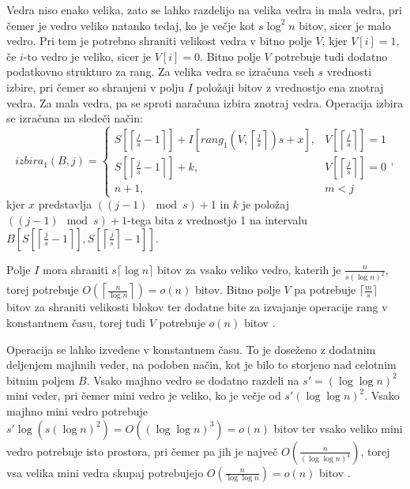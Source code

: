 Vedra niso enako velika, zato se lahko razdelijo na velika vedra in mala vedra, pri čemer je vedro veliko natanko tedaj, ko je večje kot $s\log^2 n$ bitov, sicer je malo vedro. Pri tem je potrebno shraniti velikost vedra v bitno polje $V$, kjer $V[i]=1$, če $i$-to vedro je veliko, sicer je $V[i]=0$. Bitno polje $V$ potrebuje tudi dodatno podatkovno strukturo za rang. Za velika vedra se izračuna vseh $s$ vrednosti izbire, pri čemer so shranjeni v polju $I$ položaji bitov z vrednostjo ena znotraj vedra. Za mala vedra, pa se sproti naračuna izbira znotraj vedra. Operacija izbira se izračuna na sledeči način:
\begin{equation}
    izbira_1(B,j)=\left\{
    \begin{array}{rl}
       S\left[\left\lceil \frac{j}{s} -1\right\rceil\right] + I\left[rang_1(V,\left\lceil \frac{j}{s} \right\rceil)s+x\right], & V\left[\left\lceil \frac{j}{s} \right\rceil\right] = 1\\ 
       S\left[\left\lceil \frac{j}{s} -1 \right\rceil\right] + k, & V\left[\left\lceil \frac{j}{s} \right\rceil\right] = 0\\
       n+1, & m < j
    \end{array}\right.,
\end{equation}
kjer $x$ predstavlja $((j-1) \mod{s})+1$ in $k$ je položaj $((j-1) \mod{s})+1$-tega bita z vrednostjo 1 na intervalu $B\left[ S\left[\left\lceil \frac{j}{s} -1 \right\rceil\right], S\left[\left\lceil \frac{j}{s} \right\rceil-1\right]\right]$.

Polje $I$ mora shraniti $s\lceil\log n\rceil$ bitov za vsako veliko vedro, katerih je $\frac{n}{s(\log n)^2}$, torej potrebuje $O\left(\left\lceil\frac{n}{\log n}\right\rceil\right)=o(n)$ bitov. Bitno polje $V$ pa potrebuje $\lceil \frac{m}{s} \rceil$ bitov za shraniti velikosti blokov ter dodatne bite za izvajanje operacije rang v konstantnem času, torej tudi $V$ potrebuje $o(n)$ bitov \cite{Navarro2016}.

Operacija se lahko izvedene v konstantnem času. To je doseženo z dodatnim deljenjem majhnih veder, na podoben način, kot je bilo to storjeno nad celotnim bitnim poljem $B$. Vsako majhno vedro se dodatno razdeli na $s'=(\log\log n)^2$ mini veder, pri čemer mini vedro je veliko, ko je večje od $s'(\log\log n)^2$. Vsako majhno mini vedro potrebuje $s'\log{(s(\log{n})^2)}=O((\log\log n)^3)=o(n)$ bitov ter vsako veliko mini vedro potrebuje isto prostora, pri čemer pa jih je največ $O\left(\frac{n}{(\log\log n)^4}\right)$, torej vsa velika mini vedra skupaj potrebujejo $O\left(\frac{n}{\log\log n}\right) =o(n)$ bitov \cite{Navarro2016}.


